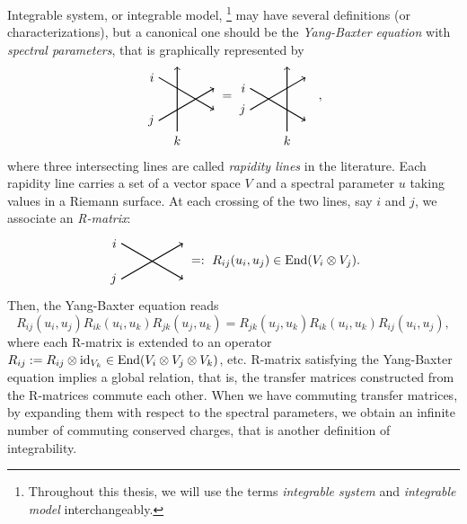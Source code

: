 Integrable system, or integrable model,%
%
\footnote{Throughout this thesis, we will use the terms \emph{integrable system} and
\emph{integrable model} interchangeably.}
%
may have several definitions (or characterizations),
but a canonical one should be the \emph{Yang-Baxter equation} with \emph{spectral parameters},
that is graphically represented by
\begin{equation}
    \begin{tikzpicture}[scale=0.6, baseline=(x.base)]
        \node (x) at (30:2) {};

        \draw[thick, ->] (0,0) node[left] {$j$} -- ++(30:3);
        \draw[thick, ->] (0,2) node[left] {$i$} -- ++(-30:3);
        \draw[thick, ->] (-30:1) node[below] {$k$} -- ++(0,3);

    \end{tikzpicture}
  \ =
    \begin{tikzpicture}[scale=0.6, baseline=(x.base)]
        \node (x) at (30:1) {};

        \draw[thick, ->] (0,0) node[left] {$j$} -- ++(30:3);
        \draw[thick, ->] (0,1) node[left] {$i$} -- ++(-30:3);
        \draw[thick, ->] (-30:2) node[below] {$k$} -- ++(0,3);

    \end{tikzpicture}
    \quad ,
\label{eq:intro_ybe0}
\end{equation}
where three intersecting lines are called \emph{rapidity lines} in the literature.
Each rapidity line carries a set of a vector space $V$ and a spectral parameter $u$
taking values in a Riemann surface.
At each crossing of the two lines, say $i$ and $j$, we associate an \emph{R-matrix}:
\begin{equation}
    \begin{tikzpicture}[scale=1, baseline=(x.base)]  \node (x) at (0,0) {\vphantom{x}};

        \draw[thick, ->] (0,-0.5) node[left] {$j$} -- ++(30:2);
        \draw[thick, ->] (0,0.5) node[left] {$i$} -- ++(-30:2);

    \end{tikzpicture}
    \ =: \
    R_{ij}(u_i,u_j) \in \End(V_i\otimes V_j).
\end{equation}
Then, the Yang-Baxter equation reads
\begin{equation}
    R_{ij}(u_{i},u_{j})R_{ik}(u_{i},u_{k})R_{jk}(u_{j},u_{k})
        =  R_{jk}(u_{j},u_{k})R_{ik}(u_{i},u_{k})R_{ij}(u_{i},u_{j})
        ,
    \label{eq:intro_ybe}
\end{equation}
where each R-matrix is extended to an operator
$R_{ij}:=R_{ij}\otimes {\rm id}_{V_k}\in\mathop{\mathrm{End}}\nolimits(V_i\otimes V_j\otimes V_k)$, etc.
R-matrix satisfying the Yang-Baxter equation implies a global relation,
that is, the transfer matrices constructed from the R-matrices commute each other.
When we have commuting transfer matrices, by expanding them with respect to the spectral parameters,
we obtain an infinite number of commuting conserved charges, that is another
definition of integrability.


